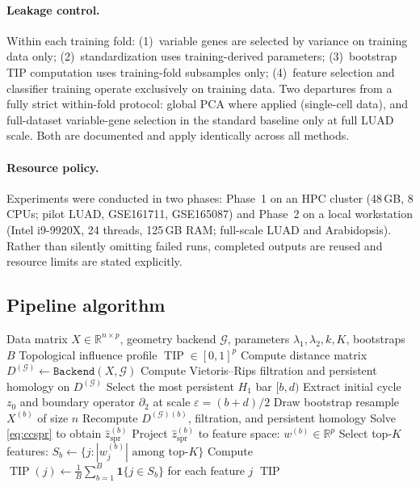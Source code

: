 \documentclass[12pt]{article}
\DeclareMathOperator{\TIP}{TIP}
\begin{document}
\paragraph{Leakage control.}
Within each training fold: (1)~variable genes are selected by variance on training data only; (2)~standardization uses training-derived parameters; (3)~bootstrap TIP computation uses training-fold subsamples only; (4)~feature selection and classifier training operate exclusively on training data.
Two departures from a fully strict within-fold protocol: global PCA where applied (single-cell data), and full-dataset variable-gene selection in the standard baseline only at full LUAD scale.
Both are documented and apply identically across all methods.

\paragraph{Resource policy.}
Experiments were conducted in two phases: Phase~1 on an HPC cluster (48\,GB, 8 CPUs; pilot LUAD, GSE161711, GSE165087) and Phase~2 on a local workstation (Intel i9-9920X, 24 threads, 125\,GB RAM; full-scale LUAD and Arabidopsis).
Rather than silently omitting failed runs, completed outputs are reused and resource limits are stated explicitly.

\subsection{Pipeline algorithm}
\label{sec:algorithm}

\begin{algorithm}[h]
\caption{CC-SPR Pipeline}
\label{alg:ccspr}
\begin{algorithmic}[1]
\REQUIRE Data matrix $X \in \mathbb{R}^{n \times p}$, geometry backend $\mathcal{G}$, parameters $\lambda_1, \lambda_2, k, K$, bootstraps $B$
\ENSURE Topological influence profile $\TIP \in [0,1]^p$
\STATE Compute distance matrix $D^{(\mathcal{G})} \gets \texttt{Backend}(X, \mathcal{G})$
\STATE Compute Vietoris--Rips filtration and persistent homology on $D^{(\mathcal{G})}$
\STATE Select the most persistent $H_1$ bar $[b, d)$
\STATE Extract initial cycle $z_0$ and boundary operator $\partial_2$ at scale $\varepsilon = (b + d)/2$
    \STATE Draw bootstrap resample $X^{(b)}$ of size $n$
    \STATE Recompute $D^{(\mathcal{G})(b)}$, filtration, and persistent homology
    \STATE Solve \eqref{eq:ccspr} to obtain $\hat{z}_{\mathrm{spr}}^{(b)}$
    \STATE Project $\hat{z}_{\mathrm{spr}}^{(b)}$ to feature space: $w^{(b)} \in \mathbb{R}^p$
    \STATE Select top-$K$ features: $S_b \gets \{j : |w^{(b)}_j| \text{ among top-}K\}$
\ENDFOR
\STATE Compute $\TIP(j) \gets \frac{1}{B} \sum_{b=1}^B \mathbf{1}\{j \in S_b\}$ for each feature $j$
\RETURN $\TIP$
\end{algorithmic}
\end{algorithm}
\end{document}
